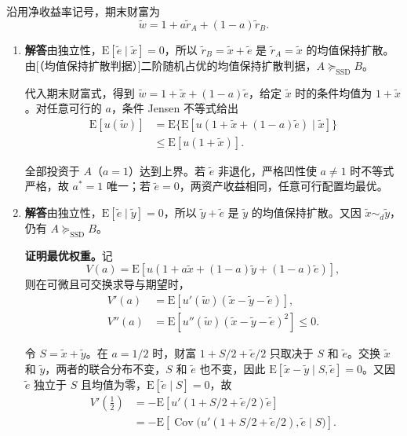 \begin{solution}[show-qed=false,blank-type=manual,blank-vsep=11\baselineskip]
沿用净收益率记号，期末财富为
\[
 \tilde w=1+a\tilde r_A+(1-a)\tilde r_B.
\]
\begin{enumerate}[label=(\alph*)]
 \item \textbf{解答}\quad 由独立性，$\mathrm E[\tilde e\mid\tilde x]=0$，所以 $\tilde r_B=\tilde x+\tilde e$ 是 $\tilde r_A=\tilde x$ 的均值保持扩散。由\ifdefined\WJHandoutKnowledge {}[（均值保持扩散判据）]\else 二阶随机占优的均值保持扩散判据\fi，$A\succeq_{\mathrm{SSD}}B$。

 代入期末财富式，得到 $\tilde w=1+\tilde x+(1-a)\tilde e$，给定 $\tilde x$ 时的条件均值为 $1+\tilde x$。对任意可行的 $a$，条件 Jensen 不等式给出
 \[
 \begin{aligned}
 \mathrm E[u(\tilde w)]
 &=\mathrm E\{\mathrm E[u(1+\tilde x+(1-a)\tilde e)\mid\tilde x]\}\\
 &\le\mathrm E[u(1+\tilde x)].
 \end{aligned}
 \]

 全部投资于 $A$（$a=1$）达到上界。若 $\tilde e$ 非退化，严格凹性使 $a\ne1$ 时不等式严格，故 $a^*=1$ 唯一；若 $\tilde e=0$，两资产收益相同，任意可行配置均最优。

 \item \textbf{解答}\quad 由独立性，$\mathrm E[\tilde e\mid\tilde y]=0$，所以 $\tilde y+\tilde e$ 是 $\tilde y$ 的均值保持扩散。又因 $\tilde x\sim_d\tilde y$，仍有 $A\succeq_{\mathrm{SSD}}B$。

 \textbf{证明最优权重。}记
 \[
 V(a)=\mathrm E[u(1+a\tilde x+(1-a)\tilde y+(1-a)\tilde e)],
 \]
 则在可微且可交换求导与期望时，
 \[
 \begin{aligned}
 V'(a)&=\mathrm E[u'(\tilde w)(\tilde x-\tilde y-\tilde e)],\\
 V''(a)&=\mathrm E[u''(\tilde w)(\tilde x-\tilde y-\tilde e)^2]\le0.
 \end{aligned}
 \]

 令 $S=\tilde x+\tilde y$。在 $a=1/2$ 时，财富 $1+S/2+\tilde e/2$ 只取决于 $S$ 和 $\tilde e$。交换 $\tilde x$ 和 $\tilde y$，两者的联合分布不变，$S$ 和 $\tilde e$ 也不变，因此 $\mathrm E[\tilde x-\tilde y\mid S,\tilde e]=0$。又因 $\tilde e$ 独立于 $S$ 且均值为零，$\mathrm E[\tilde e\mid S]=0$，故
 \[
 \begin{aligned}
 V'(\tfrac12)
 &=-\mathrm E[u'(1+S/2+\tilde e/2)\tilde e]\\
 &=-\mathrm E\!\left[\operatorname{Cov}
   \bigl(u'(1+S/2+\tilde e/2),\tilde e\mid S\bigr)\right].
 \end{aligned}
 \]


\end{enumerate}
\end{solution}
